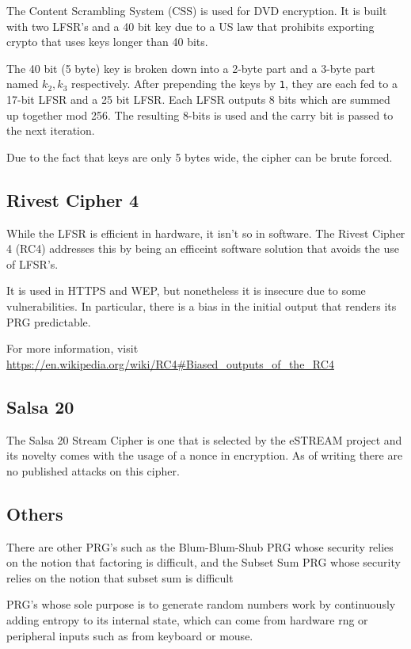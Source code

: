 \documentclass{article}
\begin{document}
\begin{multicols}{2}
The Content Scrambling System (CSS) is used for DVD encryption. It is built with two LFSR's and a 40 bit key due to a US law that prohibits exporting crypto that uses keys longer than 40 bits.

The 40 bit (5 byte) key is broken down into a 2-byte part and a 3-byte part named $k_2, k_3$ respectively. After prepending the keys by \texttt{1}, they are each fed to a 17-bit LFSR and a 25 bit LFSR. Each LFSR outputs 8 bits which are summed up together mod 256. The resulting 8-bits is used and the carry bit is passed to the next iteration.

Due to the fact that keys are only 5 bytes wide, the cipher can be brute forced.

\subsection{Rivest Cipher 4}

While the LFSR is efficient in hardware, it isn't so in software. The Rivest Cipher 4 (RC4) addresses this by being an efficeint software solution that avoids the use of LFSR's.

It is used in HTTPS and WEP, but nonetheless it is insecure due to some vulnerabilities. In particular, there is a bias in the initial output that renders its PRG predictable.

For more information, visit \url{https://en.wikipedia.org/wiki/RC4#Biased_outputs_of_the_RC4}

\subsection{Salsa 20}

The Salsa 20 Stream Cipher is one that is selected by the eSTREAM project and its novelty comes with the usage of a nonce in encryption. As of writing there are no published attacks on this cipher.

\subsection{Others}

There are other PRG's such as the Blum-Blum-Shub PRG whose security relies on the notion that factoring is difficult, and the Subset Sum PRG whose security relies on the notion that subset sum is difficult

PRG's whose sole purpose is to generate random numbers work by continuously adding entropy to its internal state, which can come from hardware rng or peripheral inputs such as from keyboard or mouse.


\end{multicols}
\end{document}
